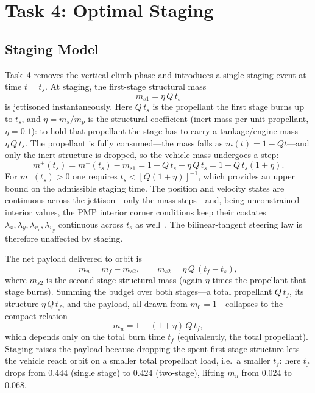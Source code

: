 \documentclass[../main.tex]{subfiles}
\begin{document}
\section{Task 4: Optimal Staging}\label{sec:task4}

\subsection{Staging Model}

Task~4 removes the vertical-climb phase and introduces a single staging event at time $t = t_s$. At staging, the first-stage structural mass
\begin{equation}
    m_{s1} = \eta\, Q\, t_s
    \label{eq:ms1}
\end{equation}
is jettisoned instantaneously. Here $Q\,t_s$ is the propellant the first stage burns up to $t_s$, and $\eta = m_s/m_p$ is the structural coefficient (inert mass per unit propellant, $\eta = 0.1$): to hold that propellant the stage has to carry a tankage/engine mass $\eta\,Q\,t_s$. The propellant is fully consumed---the mass falls as $m(t) = 1 - Q t$---and only the inert structure is dropped, so the vehicle mass undergoes a step:
\begin{equation}
    m^+(t_s) = m^-(t_s) - m_{s1} = 1 - Q\,t_s - \eta\, Q\, t_s = 1 - Q\,t_s(1 + \eta).
\end{equation}
For $m^+(t_s) > 0$ one requires $t_s < [Q(1+\eta)]^{-1}$, which provides an upper bound on the admissible staging time. The position and velocity states are continuous across the jettison---only the mass steps---and, being unconstrained interior values, the PMP interior corner conditions keep their costates $\lambda_x, \lambda_y, \lambda_{v_x}, \lambda_{v_y}$ continuous across $t_s$ as well~\cite[Lecture~5]{dclvnotes}. The bilinear-tangent steering law is therefore unaffected by staging.

The net payload delivered to orbit is
\begin{equation}
    m_u = m_f - m_{s2}, \qquad m_{s2} = \eta\, Q\,(t_f - t_s),
    \label{eq:payload}
\end{equation}
where $m_{s2}$ is the second-stage structural mass (again $\eta$ times the propellant that stage burns). Summing the budget over both stages---a total propellant $Q\,t_f$, its structure $\eta\,Q\,t_f$, and the payload, all drawn from $m_0 = 1$---collapses to the compact relation
\begin{equation}
    m_u = 1 - (1+\eta)\,Q\,t_f,
    \label{eq:pay_budget}
\end{equation}
which depends only on the total burn time $t_f$ (equivalently, the total propellant). Staging raises the payload because dropping the spent first-stage structure lets the vehicle reach orbit on a smaller total propellant load, i.e.\ a smaller $t_f$: here $t_f$ drops from $0.444$ (single stage) to $0.424$ (two-stage), lifting $m_u$ from $0.024$ to $0.068$.
\end{document}
